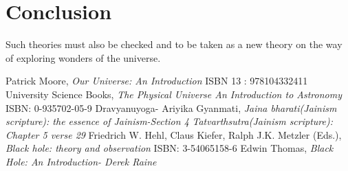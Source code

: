 \documentclass[conference]{IEEEtran}
\begin{document}
\section{Conclusion}
Such theories  must also be checked and to be taken as a new theory on the way of exploring wonders of the universe.
\begin{thebibliography}{9}
	Patrick Moore, \emph{Our Universe: An Introduction}
ISBN 13 : 978104332411
 University Science Books,	\emph{The Physical Universe An Introduction to Astronomy}
ISBN: 0-935702-05-9
	Dravyanuyoga- Ariyika Gyanmati, \emph{Jaina bharati(Jainism scripture): the essence of Jainism-Section 4}
	\emph{Tatvarthsutra(Jainism scripture): Chapter 5 verse 29}
	Friedrich W. Hehl, Claus Kiefer, Ralph J.K. Metzler (Eds.), \emph{Black hole: theory and observation}
ISBN: 3-54065158-6
	Edwin Thomas, \emph{Black Hole: An Introduction- Derek Raine}
\end{thebibliography}
\end{document}
